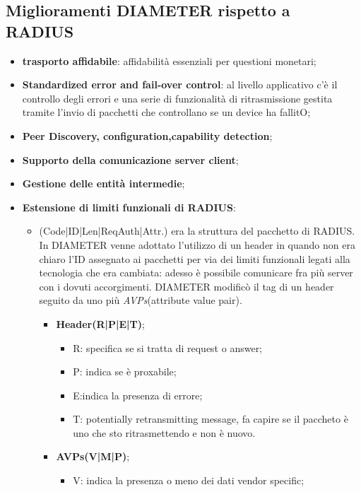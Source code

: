 \documentclass{article}
\theoremstyle{remark}
\begin{document}
\subsection{Miglioramenti DIAMETER rispetto a RADIUS}
\begin{itemize}
	\item \textbf{trasporto affidabile}: affidabilità essenziali per questioni monetari;
	\item \textbf{Standardized error and fail-over control}: al livello applicativo c'è il controllo degli errori e una serie di funzionalità di ritrasmissione gestita tramite l'invio di pacchetti che controllano se un device ha fallitO;
	      \item\textbf{Peer Discovery, configuration,capability detection};
	\item \textbf{Supporto della comunicazione server client};
	\item \textbf{Gestione delle entità intermedie};
	      \item\textbf{Estensione di limiti funzionali di RADIUS}:\begin{itemize}
		      \item (Code|ID|Len|ReqAuth|Attr.) era la struttura del pacchetto di RADIUS. In DIAMETER venne adottato l'utilizzo di un header in quando non era chiaro l'ID assegnato ai pacchetti per via dei limiti funzionali legati alla tecnologia che era cambiata: adesso è possibile comunicare fra più server con i dovuti accorgimenti. DIAMETER modificò il tag di un header seguito da uno più \emph{AVPs}(attribute value pair).
		            \begin{itemize}
			            \item \textbf{Header(R|P|E|T)};\begin{itemize}
				                  \item R: specifica se si tratta di request o answer;
				                  \item P: indica se è proxabile;
				                  \item E:indica la presenza di errore;
				                  \item T: potentially retransmitting message, fa capire se il paccheto è uno che sto ritrasmettendo e non è nuovo.
			                  \end{itemize}
			            \item \textbf{AVPs(V|M|P)};\begin{itemize}
				                  \item V: indica la presenza o meno dei dati vendor specific;

\end{itemize}
\end{itemize}
\end{itemize}
\end{itemize}
\end{document}
